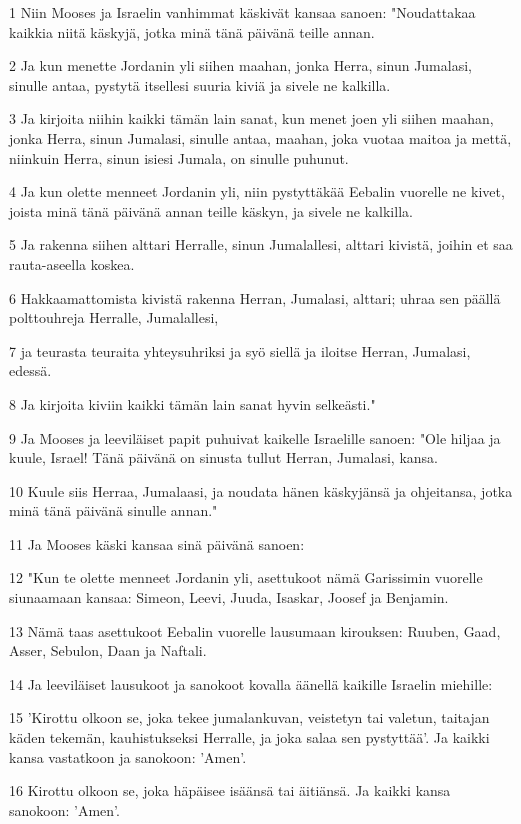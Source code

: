 \par 1 Niin Mooses ja Israelin vanhimmat käskivät kansaa sanoen: "Noudattakaa kaikkia niitä käskyjä, jotka minä tänä päivänä teille annan.
\par 2 Ja kun menette Jordanin yli siihen maahan, jonka Herra, sinun Jumalasi, sinulle antaa, pystytä itsellesi suuria kiviä ja sivele ne kalkilla.
\par 3 Ja kirjoita niihin kaikki tämän lain sanat, kun menet joen yli siihen maahan, jonka Herra, sinun Jumalasi, sinulle antaa, maahan, joka vuotaa maitoa ja mettä, niinkuin Herra, sinun isiesi Jumala, on sinulle puhunut.
\par 4 Ja kun olette menneet Jordanin yli, niin pystyttäkää Eebalin vuorelle ne kivet, joista minä tänä päivänä annan teille käskyn, ja sivele ne kalkilla.
\par 5 Ja rakenna siihen alttari Herralle, sinun Jumalallesi, alttari kivistä, joihin et saa rauta-aseella koskea.
\par 6 Hakkaamattomista kivistä rakenna Herran, Jumalasi, alttari; uhraa sen päällä polttouhreja Herralle, Jumalallesi,
\par 7 ja teurasta teuraita yhteysuhriksi ja syö siellä ja iloitse Herran, Jumalasi, edessä.
\par 8 Ja kirjoita kiviin kaikki tämän lain sanat hyvin selkeästi."
\par 9 Ja Mooses ja leeviläiset papit puhuivat kaikelle Israelille sanoen: "Ole hiljaa ja kuule, Israel! Tänä päivänä on sinusta tullut Herran, Jumalasi, kansa.
\par 10 Kuule siis Herraa, Jumalaasi, ja noudata hänen käskyjänsä ja ohjeitansa, jotka minä tänä päivänä sinulle annan."
\par 11 Ja Mooses käski kansaa sinä päivänä sanoen:
\par 12 "Kun te olette menneet Jordanin yli, asettukoot nämä Garissimin vuorelle siunaamaan kansaa: Simeon, Leevi, Juuda, Isaskar, Joosef ja Benjamin.
\par 13 Nämä taas asettukoot Eebalin vuorelle lausumaan kirouksen: Ruuben, Gaad, Asser, Sebulon, Daan ja Naftali.
\par 14 Ja leeviläiset lausukoot ja sanokoot kovalla äänellä kaikille Israelin miehille:
\par 15 'Kirottu olkoon se, joka tekee jumalankuvan, veistetyn tai valetun, taitajan käden tekemän, kauhistukseksi Herralle, ja joka salaa sen pystyttää'. Ja kaikki kansa vastatkoon ja sanokoon: 'Amen'.
\par 16 Kirottu olkoon se, joka häpäisee isäänsä tai äitiänsä. Ja kaikki kansa sanokoon: 'Amen'.
